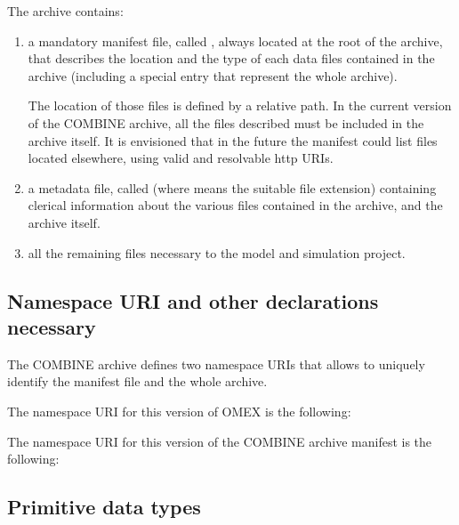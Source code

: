 The archive contains: 

\begin{enumerate}
	\item {
	
     a mandatory manifest file, called , always located at the 
     root of the archive, that describes the location and the type of each 
     data files contained in the archive (including a special entry that represent
     the whole archive).
     
     The location of those files is defined by a relative path. In the current 
     version of the COMBINE archive, all the files described must be included 
     in the archive itself. It is envisioned that in the future the manifest 
     could list files located elsewhere, using valid and resolvable http 
     URIs. 

	}
	\item {
     a metadata file, called  (where \token{*} means the 
     suitable file extension) containing clerical information about the 
     various files contained in the archive, and the archive itself. 
	}
	\item {all the remaining files necessary to the model and simulation project. }

\end{enumerate}

\subsection{Namespace URI and other declarations necessary}
\label{xml-namespace}

The COMBINE archive defines two namespace URIs that allows to uniquely 
identify the manifest file and the whole archive.

The namespace URI for this version of OMEX is the following: 

\begin{center}
\end{center}

The namespace URI for this version of the COMBINE archive manifest is the following: 

\begin{center}
\end{center}



\subsection{Primitive data types}
\label{primtypes}

